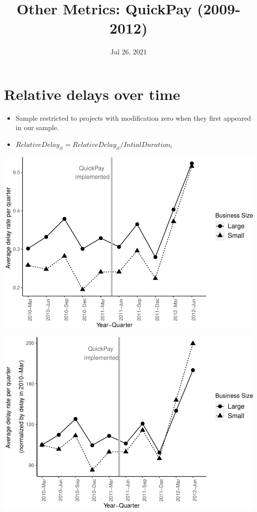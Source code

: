 \documentclass[]{article}
\title{Other Metrics: QuickPay (2009-2012)}
\author{}
\date{\vspace{-2.5em}Jul 26, 2021}
\begin{document}
\maketitle

\hypertarget{relative-delays-over-time}{%
\section{Relative delays over time}\label{relative-delays-over-time}}

\begin{itemize}
\item
  Sample restricted to projects with modification zero when they first
  appeared in our sample.
\item
  \(RelativeDelay_{it} = RelativeDelay_{it}/IntialDuration_i\)
\end{itemize}

\includegraphics{qp_first_relative_delay_files/figure-latex/plot_relative_delay-1.pdf}

\includegraphics{qp_first_relative_delay_files/figure-latex/normalized_plot-1.pdf}
\end{document}
